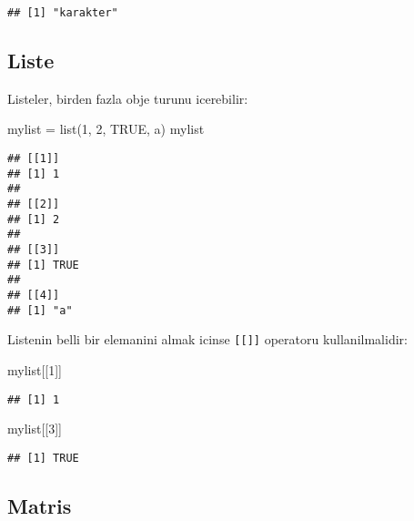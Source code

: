 \documentclass[
]{book}
\newenvironment{Shaded}{\begin{snugshade}}{\end{snugshade}}
\newcommand{\ConstantTok}[1]{\textcolor[rgb]{0.00,0.00,0.00}{#1}}
\newcommand{\DecValTok}[1]{\textcolor[rgb]{0.00,0.00,0.81}{#1}}
\newcommand{\FunctionTok}[1]{\textcolor[rgb]{0.00,0.00,0.00}{#1}}
\newcommand{\NormalTok}[1]{#1}
\newcommand{\OtherTok}[1]{\textcolor[rgb]{0.56,0.35,0.01}{#1}}
\newcommand{\StringTok}[1]{\textcolor[rgb]{0.31,0.60,0.02}{#1}}
\begin{document}
\begin{verbatim}
## [1] "karakter"
\end{verbatim}

\hypertarget{liste}{%
\subsection{Liste}\label{liste}}

Listeler, birden fazla obje turunu icerebilir:

\begin{Shaded}
\begin{Highlighting}[]
\NormalTok{mylist }\OtherTok{=} \FunctionTok{list}\NormalTok{(}\DecValTok{1}\NormalTok{, }\DecValTok{2}\NormalTok{, }\ConstantTok{TRUE}\NormalTok{, }\StringTok{\textquotesingle{}a\textquotesingle{}}\NormalTok{)}
\NormalTok{mylist}
\end{Highlighting}
\end{Shaded}

\begin{verbatim}
## [[1]]
## [1] 1
## 
## [[2]]
## [1] 2
## 
## [[3]]
## [1] TRUE
## 
## [[4]]
## [1] "a"
\end{verbatim}

Listenin belli bir elemanini almak icinse \texttt{{[}{[}{]}{]}} operatoru kullanilmalidir:

\begin{Shaded}
\begin{Highlighting}[]
\NormalTok{mylist[[}\DecValTok{1}\NormalTok{]]}
\end{Highlighting}
\end{Shaded}

\begin{verbatim}
## [1] 1
\end{verbatim}

\begin{Shaded}
\begin{Highlighting}[]
\NormalTok{mylist[[}\DecValTok{3}\NormalTok{]]}
\end{Highlighting}
\end{Shaded}

\begin{verbatim}
## [1] TRUE
\end{verbatim}

\hypertarget{matris}{%
\subsection{Matris}\label{matris}}
\end{document}

